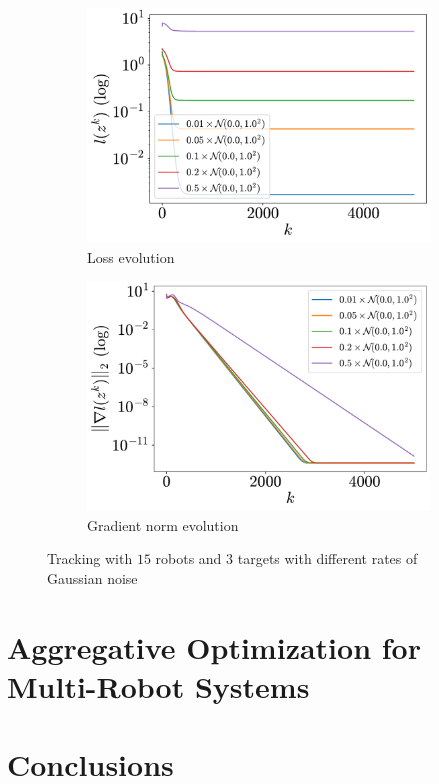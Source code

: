 \documentclass[a4paper,11pt,oneside]{book}
\begin{document}
\begin{figure}[tb!]
      \centering
      \begin{subfigure}[t]{0.46\linewidth}
            \centering
            \includegraphics[width=\linewidth]{./figs/tracking/rates/loss.pdf} 
            \caption{Loss evolution}
      \end{subfigure}
      \hfill
      \begin{subfigure}[t]{0.46\linewidth}
            \centering
            \includegraphics[width=\linewidth]{./figs/tracking/rates/gradient.pdf} 
            \caption{Gradient norm evolution}
      \end{subfigure}
      \caption{Tracking with $15$ robots and $3$ targets with different rates of Gaussian noise}
      \label{fig:tracking_rates_15_3}
\end{figure}


\chapter{Aggregative Optimization for Multi-Robot Systems}





\chapter*{Conclusions}



{}

\end{document}
